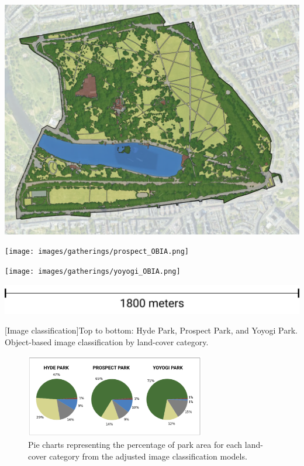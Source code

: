\begin{multicols}{2}
\begin{minipage}{0.45\textwidth}
    \centering
    \includegraphics[width=\linewidth]{images/gatherings/hyde_OBIA.png}\par\hspace{5pt} 
    \texttt{[image: images/gatherings/prospect\_OBIA.png]}\par\hspace{5pt} 
    \texttt{[image: images/gatherings/yoyogi\_OBIA.png]}\par\hspace{5pt} 
    \includegraphics[width=\linewidth]{images/gatherings/scale_legend.png}\par{}[Image classification]{Top to bottom: Hyde Park, Prospect Park, and Yoyogi Park. Object-based image classification by land-cover category.}
    \label{fig:obia_parks}
\end{minipage}

\end{multicols}

\begin{figure}[h]
  \centering
  \includegraphics[width=0.7\textwidth]{images/gatherings/pie_charts.png}
  \captionsetup{width=0.7\linewidth}
  \caption[Classification pie charts]{Pie charts representing the percentage of park area for each land-cover category from the adjusted image classification models.}
  \label{fig:pie_charts}
\end{figure}\par
\vspace{5pt}

